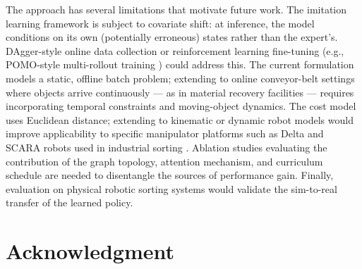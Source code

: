 \documentclass[conference]{IEEEtran}
\begin{document}
The approach has several limitations that motivate future work. The imitation learning framework is subject to covariate shift: at inference, the model conditions on its own (potentially erroneous) states rather than the expert's. DAgger-style online data collection \cite{ross2011dagger} or reinforcement learning fine-tuning (e.g., POMO-style multi-rollout training \cite{kwon2020pomo}) could address this. The current formulation models a static, offline batch problem; extending to online conveyor-belt settings where objects arrive continuously --- as in material recovery facilities --- requires incorporating temporal constraints and moving-object dynamics. The cost model uses Euclidean distance; extending to kinematic or dynamic robot models would improve applicability to specific manipulator platforms such as Delta and SCARA robots used in industrial sorting \cite{han2019pap}. Ablation studies evaluating the contribution of the graph topology, attention mechanism, and curriculum schedule are needed to disentangle the sources of performance gain. Finally, evaluation on physical robotic sorting systems would validate the sim-to-real transfer of the learned policy.

\section*{Acknowledgment}
\end{document}
